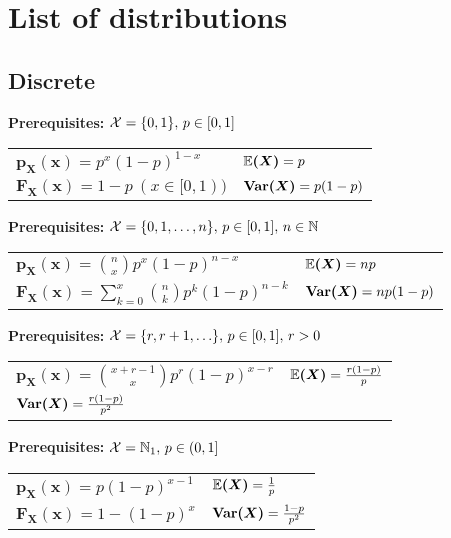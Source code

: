 \section{List of distributions}
\subsection*{Discrete}

\renewcommand{\arraystretch}{1.8}
\begin{ddefinition*}
  \textbf{Prerequisites:} \(\operatorname{\mathcal{X}} = \{0, 1\}, \, p \in [0, 1]\) \\
  \begin{tabularx}{\linewidth}{@{}ll@{}}
    \(\bm{p_X(x)} = p^x(1 - p)^{1 - x}\) & \(\bm{\mathbb{E}(X)} = p\) \\
    \(\bm{F_X(x)} = 1 - p \ (x \in [0, 1))\) & \(\bm{\Var(X)} = p(1 - p)\)
  \end{tabularx}
\end{ddefinition*}

\begin{ddefinition*}
  \textbf{Prerequisites:} \(\operatorname{\mathcal{X}} = \{0, 1, \ldots, n\}, \, p \in [0, 1], \, n \in \mathbb{N}\) \\
  \begin{tabularx}{\linewidth}{@{}ll@{}}
    \(\bm{p_X(x)} = \binom{n}{x}p^x(1 - p)^{n - x}\) & \(\bm{\mathbb{E}(X)} = np\) \\
    \(\bm{F_X(x)} = \sum\limits_{k = 0}^x \binom{n}{k}p^k (1-p)^{n-k}\) & \(\bm{\Var(X)} = np(1 - p)\)
  \end{tabularx}
\end{ddefinition*}

\begin{ddefinition*}
  \textbf{Prerequisites:} \(\operatorname{\mathcal{X}} = \{r, r+1, \ldots\}, \, p \in [0, 1], \, r > 0\) \\
  \begin{tabularx}{\linewidth}{@{}ll@{}}
    \(\bm{p_X(x)} = \binom{x + r - 1}{x}p^r(1 - p)^{x - r}\) & \(\bm{\mathbb{E}(X)} = \frac{r(1 - p)}{p}\) \\
    \(\bm{\Var(X)} = \frac{r(1 - p)}{p^2}\)
  \end{tabularx}
\end{ddefinition*}

\begin{ddefinition*}
  \textbf{Prerequisites:} \(\operatorname{\mathcal{X}} = \mathbb{N}_1, \, p \in (0, 1]\) \\
  \begin{tabularx}{\linewidth}{@{}ll@{}}
    \(\bm{p_X(x)} = p(1-p)^{x-1}\) & \(\bm{\mathbb{E}(X)} = \frac{1}{p}\) \\
    \(\bm{F_X(x)} = 1 - (1 - p)^x\) & \(\bm{\Var(X)} = \frac{1 - p}{p^2}\)
  \end{tabularx}
\end{ddefinition*}

